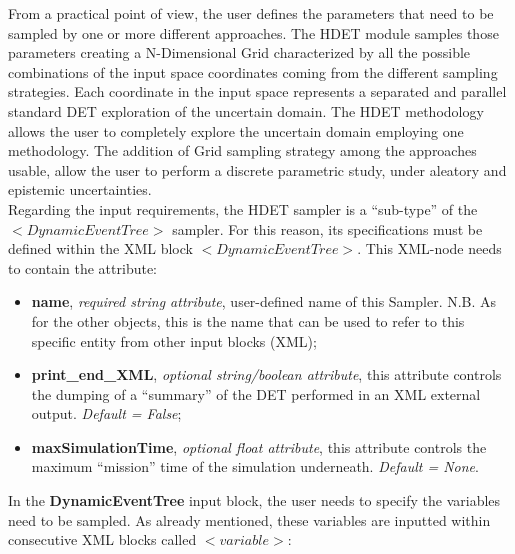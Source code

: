 From a practical point of view, the user defines the parameters that need to be sampled by one or more different approaches. The HDET module samples those parameters creating a N-Dimensional Grid characterized by all the possible combinations of the input space coordinates coming from the different sampling strategies. Each coordinate in the input space represents a separated and parallel standard DET exploration of the uncertain domain.
The HDET methodology allows the user to completely explore the uncertain domain employing one methodology. The addition of Grid sampling strategy among the approaches usable, allow the user to perform a discrete parametric study, under aleatory and epistemic uncertainties.
\\ Regarding the input requirements, the HDET sampler is a ``sub-type'' of the  $<DynamicEventTree>$ sampler.
For this reason, its specifications  must be defined within the XML block $<DynamicEventTree>$. This XML-node needs to contain the attribute:
\begin{itemize}
\itemsep0em
\item \textbf{name}, \textit{required string attribute}, user-defined name of this Sampler. N.B. As for the other objects, this is the name that can be used to refer to this specific entity from other input blocks (XML);
\item \textbf{print\_end\_XML}, \textit{optional string/boolean attribute}, this attribute controls the dumping of a ``summary'' of the DET performed in an XML external output. \textit{Default = False};
\item \textbf{maxSimulationTime}, \textit{optional float attribute}, this attribute controls the maximum ``mission'' time of the simulation underneath. \textit{Default = None}.
\end{itemize}
In the \textbf{DynamicEventTree} input block, the user needs to specify the variables need to be sampled. As already mentioned, these variables are inputted within consecutive XML blocks called $<variable>$:
